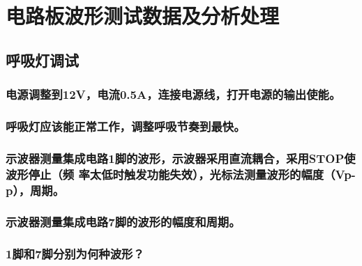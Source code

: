 \documentclass[10.5pt]{config}
\begin{document}
\clearpage
\section{电路板波形测试数据及分析处理}
\subsection{呼吸灯调试}
\subsubsection{电源调整到12V，电流0.5A，连接电源线，打开电源的输出使能。}
\subsubsection{呼吸灯应该能正常工作，调整呼吸节奏到最快。}
\subsubsection{示波器测量集成电路1脚的波形，示波器采用直流耦合，采用STOP使波形停止（频
率太低时触发功能失效），光标法测量波形的幅度（Vp-p），周期。}
\subsubsection{示波器测量集成电路7脚的波形的幅度和周期。}
\subsubsection{1脚和7脚分别为何种波形？}
\end{document}
